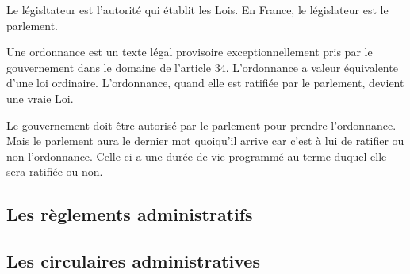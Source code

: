\documentclass[12pt, a4paper, openany]{book}
\begin{document}
Le législtateur est l'autorité qui établit les Lois. En France, le législateur est le parlement.


Une ordonnance est un texte légal provisoire exceptionnellement pris par le gouvernement dans le domaine de l'article 34. L'ordonnance a valeur équivalente d'une loi ordinaire. L'ordonnance, quand elle est ratifiée par le parlement, devient une vraie Loi.

Le gouvernement doit être autorisé par le parlement pour prendre l'ordonnance. Mais le parlement aura le dernier mot quoiqu'il arrive car c'est à lui de ratifier ou non l'ordonnance. Celle-ci a une durée de vie programmé au terme duquel elle sera ratifiée ou non.

\subsection{Les règlements administratifs}


\subsection{Les circulaires administratives}
\end{document}
